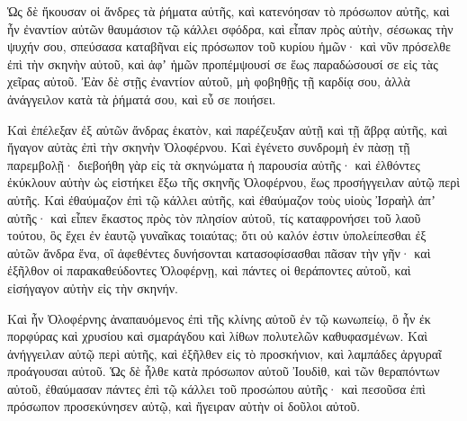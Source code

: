 {\par }{\PP {}Ὡς δὲ ἤκουσαν οἱ ἄνδρες τὰ ῥήματα αὐτῆς, καὶ κατενόησαν τὸ πρόσωπον αὐτῆς, καὶ ἦν ἐναντίον αὐτῶν θαυμάσιον τῷ κάλλει σφόδρα, καὶ εἶπαν πρὸς αὐτὴν,
σέσωκας τὴν ψυχήν σου, σπεύσασα καταβῆναι εἰς πρόσωπον τοῦ κυρίου ἡμῶν· καὶ νῦν πρόσελθε ἐπὶ τὴν σκηνὴν αὐτοῦ, καὶ ἀφʼ ἡμῶν προπέμψουσί σε ἕως παραδώσουσί σε εἰς τὰς χεῖρας αὐτοῦ.
Ἐὰν δὲ στῇς ἐναντίον αὐτοῦ, μὴ φοβηθῇς τῇ καρδίᾳ σου, ἀλλὰ ἀνάγγειλον κατὰ τὰ ῥήματά σου, καὶ εὖ σε ποιήσει.
\par }{\PP {}Καὶ ἐπέλεξαν ἐξ αὐτῶν ἄνδρας ἑκατὸν, καὶ παρέζευξαν αὐτῇ καὶ τῇ ἅβρᾳ αὐτῆς, καὶ ἤγαγον αὐτὰς ἐπὶ τὴν σκηνὴν Ὀλοφέρνου.
Καὶ ἐγένετο συνδρομὴ ἐν πὰσῃ τῇ παρεμβολῇ· διεβοήθη γὰρ εἰς τὰ σκηνώματα ἡ παρουσία αὐτῆς· καὶ ἐλθόντες ἐκύκλουν αὐτὴν ὡς εἱστήκει ἔξω τῆς σκηνῆς Ὀλοφέρνου, ἕως προσήγγειλαν αὐτῷ περὶ αὐτῆς.
Καὶ ἐθαύμαζον ἐπὶ τῷ κάλλει αὐτῆς, καὶ ἐθαύμαζον τοὺς υἱοὺς Ἰσραὴλ ἀπʼ αὐτῆς· καὶ εἶπεν ἕκαστος πρὸς τὸν πλησίον αὐτοῦ, τίς καταφρονήσει τοῦ λαοῦ τούτου, ὃς ἔχει ἐν ἑαυτῷ γυναῖκας τοιαύτας; ὅτι οὐ καλόν ἐστιν ὑπολείπεσθαι ἐξ αὐτῶν ἄνδρα ἕνα, οἳ ἀφεθέντες δυνήσονται κατασοφίσασθαι πᾶσαν τὴν γῆν·
καὶ ἐξῆλθον οἱ παρακαθεύδοντες Ὀλοφέρνῃ, καὶ πάντες οἱ θεράποντες αὐτοῦ, καὶ εἰσήγαγον αὐτὴν εἰς τὴν σκηνήν.
\par }{\PP {}Καὶ ἦν Ὀλοφέρνης ἀναπαυόμενος ἐπὶ τῆς κλίνης αὐτοῦ ἐν τῷ κωνωπείῳ, ὃ ἦν ἐκ πορφύρας καὶ χρυσίου καὶ σμαράγδου καὶ λίθων πολυτελῶν καθυφασμένων.
Καὶ ἀνήγγειλαν αὐτῷ περὶ αὐτῆς, καὶ ἐξῆλθεν εἰς τὸ προσκήνιον, καὶ λαμπάδες ἀργυραῖ προάγουσαι αὐτοῦ.
Ὡς δὲ ἦλθε κατὰ πρόσωπον αὐτοῦ Ἰουδὶθ, καὶ τῶν θεραπόντων αὐτοῦ, ἐθαύμασαν πάντες ἐπὶ τῷ κάλλει τοῦ προσώπου αὐτῆς· καὶ πεσοῦσα ἐπὶ πρόσωπον προσεκύνησεν αὐτῷ, καὶ ἤγειραν αὐτὴν οἱ δοῦλοι αὐτοῦ.

}
